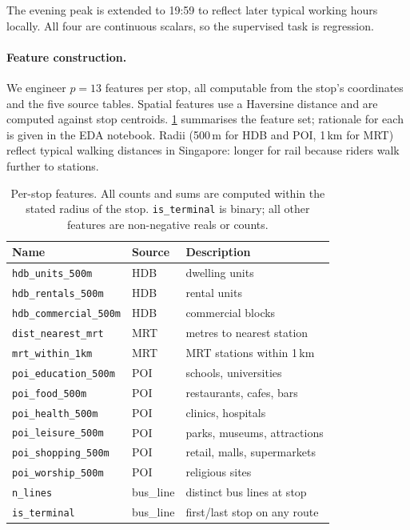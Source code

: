 \documentclass{article}
\begin{document}
The evening peak is extended to 19:59 to reflect later typical working
hours locally. All four are continuous scalars, so the supervised task is
regression.

\paragraph{Feature construction.}
We engineer $p = 13$ features per stop, all computable from the stop's
coordinates and the five source tables. Spatial features use a Haversine
distance and are computed against stop centroids. \cref{tab:features}
summarises the feature set; rationale for each is given in the EDA
notebook. Radii (500\,m for HDB and POI, 1\,km for MRT) reflect typical
walking distances in Singapore: longer for rail because riders walk further
to stations.

\begin{table}[t]
  \centering
  \small
  \caption{Per-stop features. All counts and sums are computed within the
    stated radius of the stop. \texttt{is\_terminal} is binary; all other
    features are non-negative reals or counts.}
  \label{tab:features}
  \begin{tabular}{@{}lll@{}}
    \toprule
    Name                           & Source    & Description                  \\
    \midrule
    \texttt{hdb\_units\_500m}      & HDB       & dwelling units               \\
    \texttt{hdb\_rentals\_500m}    & HDB       & rental units                 \\
    \texttt{hdb\_commercial\_500m} & HDB       & commercial blocks            \\
    \texttt{dist\_nearest\_mrt}    & MRT       & metres to nearest station    \\
    \texttt{mrt\_within\_1km}      & MRT       & MRT stations within 1\,km    \\
    \texttt{poi\_education\_500m}  & POI       & schools, universities        \\
    \texttt{poi\_food\_500m}       & POI       & restaurants, cafes, bars     \\
    \texttt{poi\_health\_500m}     & POI       & clinics, hospitals           \\
    \texttt{poi\_leisure\_500m}    & POI       & parks, museums, attractions  \\
    \texttt{poi\_shopping\_500m}   & POI       & retail, malls, supermarkets  \\
    \texttt{poi\_worship\_500m}    & POI       & religious sites              \\
    \texttt{n\_lines}              & bus\_line & distinct bus lines at stop   \\
    \texttt{is\_terminal}          & bus\_line & first/last stop on any route \\
    \bottomrule
  \end{tabular}
\end{table}
\end{document}
